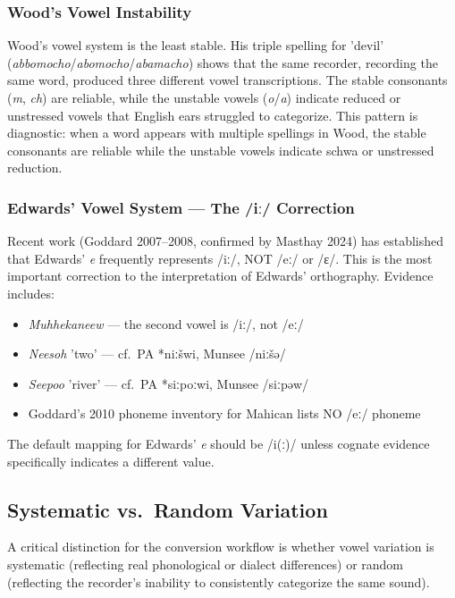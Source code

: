 \subsubsection{Wood's Vowel Instability}

Wood's vowel system is the least stable. His triple spelling for 'devil'
(\textit{abbomocho}/\textit{abomocho}/\textit{abamacho}) shows that the
same recorder, recording the same word, produced three different vowel
transcriptions. The stable consonants (\textit{m}, \textit{ch}) are reliable,
while the unstable vowels (\textit{o}/\textit{a}) indicate reduced or
unstressed vowels that English ears struggled to categorize. This pattern is
diagnostic: when a word appears with multiple spellings in Wood, the stable
consonants are reliable while the unstable vowels indicate schwa or
unstressed reduction.

\subsubsection{Edwards' Vowel System --- The /iː/ Correction}

Recent work (Goddard 2007--2008, confirmed by Masthay 2024) has established
that Edwards' \textit{e} frequently represents /iː/, NOT /eː/ or /ɛ/. This
is the most important correction to the interpretation of Edwards'
orthography. Evidence includes:

\begin{itemize}
  \item \textit{Muhhekaneew} --- the second vowel is /iː/, not /eː/
  \item \textit{Neesoh} 'two' --- cf.\ PA *niːšwi, Munsee /niːšə/
  \item \textit{Seepoo} 'river' --- cf.\ PA *siːpoːwi, Munsee /siːpəw/
  \item Goddard's 2010 phoneme inventory for Mahican lists NO /eː/ phoneme
\end{itemize}

The default mapping for Edwards' \textit{e} should be /i(ː)/ unless cognate
evidence specifically indicates a different value.

\subsection{Systematic vs.\ Random Variation}

A critical distinction for the conversion workflow is whether vowel variation
is systematic (reflecting real phonological or dialect differences) or random
(reflecting the recorder's inability to consistently categorize the same
sound).

